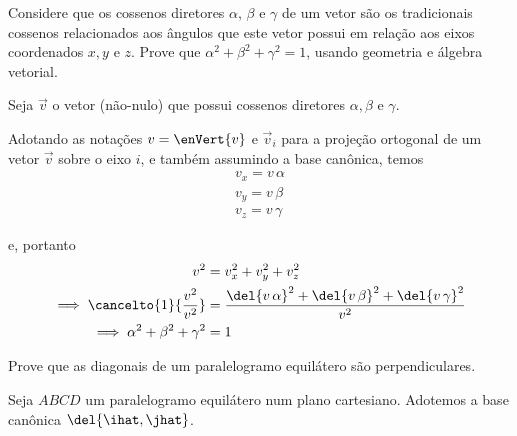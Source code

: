 \documentclass[]{IMTexam}
\author{Isabella B.}
\date{}
\begin{document}
\maketitle

\begin{questions}

	\question Considere que os cossenos diretores $\alpha$, $\beta$ e $\gamma$ de um vetor são os tradicionais cossenos relacionados aos ângulos que este vetor possui em relação aos eixos coordenados $ x, y $ e $ z $. Prove que $\alpha^{2} + \beta^{2} + \gamma^{2} = 1$, usando geometria e álgebra vetorial.

	\begin{solution}
		Seja $ \vec{v} $ o vetor (não-nulo) que possui cossenos diretores $ \alpha, \beta $ e $\gamma$.

		\smallskip

		\begin{multi}
			Adotando as notações $ v=\enVert{v} $ e $ \vec{v}_i $ para a projeção ortogonal de um vetor $ \vec{v} $ sobre o eixo $ i $, e também assumindo a base canônica, temos
			\begin{gather*}
				v_x = v\,\alpha\\
				v_y = v\,\beta\\
				v_z = v\,\gamma
			\end{gather*}

			\nextcol

			e, portanto
			\begin{align*}
				v^{2}                                      & =v_x^{2}+v_y^{2}+v_z^{2}                                                   \\
				\implies\cancelto{1}{\dfrac{v^{2}}{v^{2}}} & =\dfrac{\del{v\,\alpha}^{2}+\del{v\,\beta}^{2}+\del{v\,\gamma}^{2}}{v^{2}} \\
				\implies\alpha^{2}+\beta^{2}+\gamma^{2}    & =1
			\end{align*}

		\end{multi}

		\hfill\qedsymbol
	\end{solution}

	\question Prove que as diagonais de um paralelogramo equilátero são perpendiculares.

	\begin{solution}

		\begin{multi}
			Seja $ ABCD $ um paralelogramo equilátero num plano cartesiano. Adotemos a base canônica $ \del{\ihat,\jhat} $.


\end{multi}
\end{solution}
\end{questions}
\end{document}
